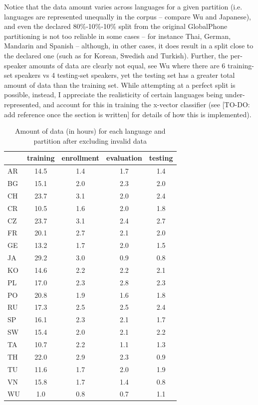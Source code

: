 \documentclass[bsc,frontabs,twoside,singlespacing,parskip,deptreport]{infthesis}
\begin{document}
{{    Notice that the data amount varies across languages for a given partition (i.e. languages are represented unequally in the corpus -- compare Wu and Japanese), and even the declared 80\%-10\%-10\% split from the original GlobalPhone partitioning is not too reliable in some cases -- for instance Thai, German, Mandarin and Spanish -- although, in other cases, it does result in a split close to the declared one (such as for Korean, Swedish and Turkish). Further, the per-speaker amounts of data are clearly not equal, see Wu where there are 6 training-set speakers vs 4 testing-set speakers, yet the testing set has a greater total amount of data than the training set. While attempting at a perfect split is possible, instead, I appreciate the realisticity of certain languages being under-represented, and account for this in training the x-vector classifier (see [TO-DO: add reference once the section is written] for details of how this is implemented).

    \begin{table}[h!tb]
      \centering
      \begin{sc}
        \footnotesize
        \begin{tabular}{l|c|c|c|c}
             & training & enrollment & evaluation & testing \\
          \hline
          AR & 14.5 & 1.4 & 1.7 & 1.4\\
          BG & 15.1 & 2.0 & 2.3 & 2.0\\
          CH & 23.7 & 3.1 & 2.0 & 2.4\\
          CR & 10.5 & 1.6 & 2.0 & 1.8\\
          CZ & 23.7 & 3.1 & 2.4 & 2.7\\
          FR & 20.1 & 2.7 & 2.1 & 2.0\\
          GE & 13.2 & 1.7 & 2.0 & 1.5\\
          JA & 29.2 & 3.0 & 0.9 & 0.8\\
          KO & 14.6 & 2.2 & 2.2 & 2.1\\
          PL & 17.0 & 2.3 & 2.8 & 2.3\\
          PO & 20.8 & 1.9 & 1.6 & 1.8\\
          RU & 17.3 & 2.5 & 2.5 & 2.4\\
          SP & 16.1 & 2.3 & 2.1 & 1.7\\
          SW & 15.4 & 2.0 & 2.1 & 2.2\\
          TA & 10.7 & 2.2 & 1.1 & 1.3\\
          TH & 22.0 & 2.9 & 2.3 & 0.9\\
          TU & 11.6 & 1.7 & 2.0 & 1.9\\
          VN & 15.8 & 1.7 & 1.4 & 0.8\\
          WU & 1.0 & 0.8 & 0.7 & 1.1\\
        \end{tabular}
      \end{sc}
      \caption{Amount of data (in hours) for each language and partition after excluding invalid data}
      \label{tab:data-amounts}
    \end{table}

}}
\end{document}
